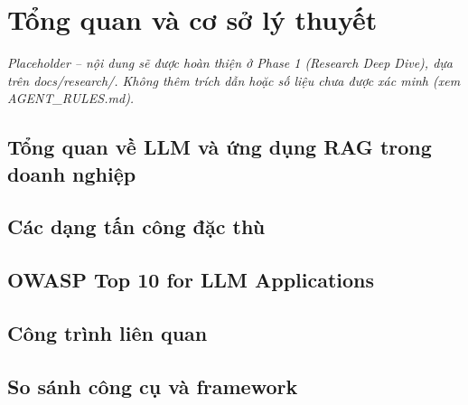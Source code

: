 \chapter{Tổng quan và cơ sở lý thuyết}
\label{ch:tong-quan}

\textit{Placeholder -- nội dung sẽ được hoàn thiện ở Phase 1 (Research Deep Dive), dựa trên docs/research/. Không thêm trích dẫn hoặc số liệu chưa được xác minh (xem AGENT\_RULES.md).}

\section{Tổng quan về LLM và ứng dụng RAG trong doanh nghiệp}

\section{Các dạng tấn công đặc thù}

\section{OWASP Top 10 for LLM Applications}

\section{Công trình liên quan}

\section{So sánh công cụ và framework}
